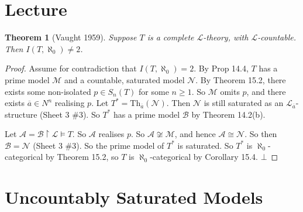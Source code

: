 \documentclass[]{article}
\theoremstyle{custhm}
\newtheorem{theorem}{Theorem}[section]
\theoremstyle{cusdef}
\theoremstyle{custhm}
\theoremstyle{custhm}
\theoremstyle{custhm}
\theoremstyle{ex}
\theoremstyle{custhm}
\theoremstyle{cusdef}
\theoremstyle{remark}
\theoremstyle{remark}
\theoremstyle{numremark}
\renewcommand{\L}{\mathcal{L}}
\newcommand{\M}{\mathcal{M}}
\renewcommand{\bar}{\overline}
\newcommand{\Th}{\textrm{Th}}
\newcommand{\false}{\bot}
\newcommand{\N}{\mathcal{N}}
\newcommand{\A}{\mathcal{A}}
\begin{document}
\section{Lecture}

\begin{theorem}[Vaught 1959]
	Suppose $T$ is a complete $\L$-theory, with $\L$-countable. Then $I(T,\aleph_0) \ne 2$.
\end{theorem}
\begin{proof}
	Assume for contradiction that $I(T,\aleph_0) = 2$. By Prop 14.4, $T$ has a prime model $\M$ and a countable, saturated model $\N$. By Theorem 15.2, there exists some non-isolated $p\in S_n(T)$ for some $n\ge 1$. So $\M$ omits $p$, and there exists $\bar{a}\in N^n$ realising $p$. Let $T^\ast = \Th_{\bar{a}}(\N)$. Then $\N$ is still saturated as an $\L_{\bar{a}}$-structure (Sheet 3 \#3). So $T^\ast$ has a prime model $\mathcal{B}$ by Theorem 14.2(b).

	Let $\A = \mathcal{B}\upharpoonright\L\models T$. So $\A$ realises $p$. So $\A\not\cong\M$, and hence $\A\cong \N$. So then $\mathcal{B} = \N$ (Sheet 3 \#3). So the prime model of $T^\ast$ is saturated. So $T^\ast$ is $\aleph_0$-categorical by Theorem 15.2, so $T$ is $\aleph_0$-categorical by Corollary 15.4. $\false$
\end{proof}

\section*{Uncountably Saturated Models}
\end{document}
